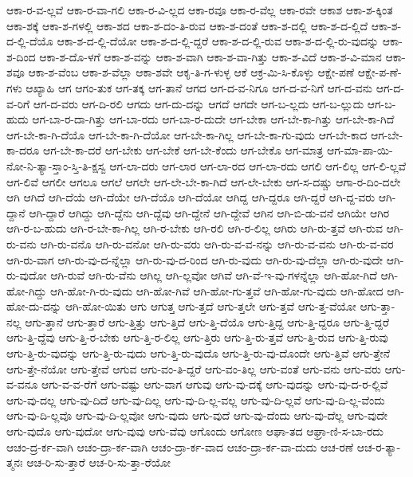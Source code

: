 {ಆಕಾ-ರ-ವ-ಲ್ಲವೆ
ಆಕಾ-ರ-ವಾ-ಗಲಿ
ಆಕಾ-ರ-ವಿ-ಲ್ಲದ
ಆಕಾ-ರವೂ
ಆಕಾ-ರ-ವೆಲ್ಲ
ಆಕಾ-ರವೇ
ಆಕಾಶ
ಆಕಾ-ಶ-ಕ್ಕಿಂತ
ಆಕಾ-ಶಕ್ಕೆ
ಆಕಾ-ಶ-ಗಳಲ್ಲಿ
ಆಕಾ-ಶದ
ಆಕಾ-ಶ-ದಂ-ತಿ-ರುವ
ಆಕಾ-ಶ-ದಂತೆ
ಆಕಾ-ಶ-ದಲ್ಲಿ
ಆಕಾ-ಶ-ದ-ಲ್ಲಿದೆ
ಆಕಾ-ಶ-ದ-ಲ್ಲಿ-ದೆಯೊ
ಆಕಾ-ಶ-ದ-ಲ್ಲಿ-ದೆಯೋ
ಆಕಾ-ಶ-ದ-ಲ್ಲಿ-ದ್ದರೆ
ಆಕಾ-ಶ-ದ-ಲ್ಲಿ-ರುವ
ಆಕಾ-ಶ-ದ-ಲ್ಲಿ-ರು-ವುದನ್ನು
ಆಕಾ-ಶ-ದಿಂದ
ಆಕಾ-ಶ-ದೊ-ಳಗೆ
ಆಕಾ-ಶ-ವನ್ನು
ಆಕಾ-ಶ-ವಾಗಿ
ಆಕಾ-ಶ-ವಾ-ಗಿತ್ತು
ಆಕಾ-ಶ-ವಿದೆ
ಆಕಾ-ಶ-ವಿ-ಮಾನ
ಆಕಾ-ಶವೂ
ಆಕಾ-ಶ-ವೆಂಬ
ಆಕಾ-ಶ-ವೆಲ್ಲಾ
ಆಕಾ-ಶವೇ
ಆಕೃ-ತಿ-ಗ-ಳುಳ್ಳ
ಆಕೆ
ಆಕ್ರ-ಮಿ-ಸಿ-ಕೊಳ್ಳು
ಆಕ್ಷೇ-ಪಣೆ
ಆಕ್ಷೇ-ಪ-ಣೆ-ಗಳು
ಆಖ್ಯಾಹಿ
ಆಗ
ಆಗಂ-ತುಕ
ಆಗ-ತಕ್ಕ
ಆಗ-ತಾನೆ
ಆಗದ
ಆಗ-ದ-ವ-ನಿಗೂ
ಆಗ-ದ-ವ-ನಿಗೆ
ಆಗ-ದ-ವನು
ಆಗ-ದ-ವ-ರಿಗೆ
ಆಗ-ದ-ವರು
ಆಗ-ದಿ-ರಲಿ
ಆಗದು
ಆಗ-ದು-ದನ್ನು
ಆಗದೆ
ಆಗದೇ
ಆಗ-ಬ-ಲ್ಲದು
ಆಗ-ಬ-ಲ್ಲುದು
ಆಗ-ಬ-ಹುದು
ಆಗ-ಬಾ-ರ-ದಾ-ಗಿತ್ತು
ಆಗ-ಬಾ-ರದು
ಆಗ-ಬಾ-ರ-ದುದೇ
ಆಗ-ಬೇಕಾ
ಆಗ-ಬೇ-ಕಾ-ಗಿತ್ತು
ಆಗ-ಬೇ-ಕಾ-ಗಿದೆ
ಆಗ-ಬೇ-ಕಾ-ಗಿ-ದೆಯೊ
ಆಗ-ಬೇ-ಕಾ-ಗಿ-ದೆಯೋ
ಆಗ-ಬೇ-ಕಾ-ಗಿಲ್ಲ
ಆಗ-ಬೇ-ಕಾ-ಗು-ವುದು
ಆಗ-ಬೇ-ಕಾದ
ಆಗ-ಬೇ-ಕಾ-ದರೂ
ಆಗ-ಬೇ-ಕಾ-ದರೆ
ಆಗ-ಬೇಕು
ಆಗ-ಬೇಕೆ
ಆಗ-ಬೇ-ಕೆಂದು
ಆಗ-ಬೇಕೊ
ಆಗ-ಮಾತ್ರ
ಆಗ-ಮಾ-ಪಾ-ಯಿ-ನೋ-ನಿ-ತ್ಯಾ-ಸ್ತಾಂ-ಸ್ತಿ-ತಿ-ಕ್ಷಸ್ವ
ಆಗ-ಲಾ-ದರು
ಆಗ-ಲಾರ
ಆಗ-ಲಾ-ರದ
ಆಗ-ಲಾ-ರದು
ಆಗಲಿ
ಆಗ-ಲಿಲ್ಲ
ಆಗ-ಲಿ-ಲ್ಲವೆ
ಆಗ-ಲಿವೆ
ಆಗಲೀ
ಆಗಲೂ
ಆಗಲೆ
ಆಗಲೇ
ಆಗ-ಲೇ-ಬೇ-ಕಾ-ಗಿದೆ
ಆಗ-ಲೇ-ಬೇಕು
ಆಗ-ಸ-ದಷ್ಚು
ಆಗಾ-ರ-ದಿಂ-ದಲೇ
ಆಗಿ
ಆಗಿದೆ
ಆಗಿ-ದೆಯೆ
ಆಗಿ-ದೆಯೇ
ಆಗಿ-ದೆಯೊ
ಆಗಿ-ದೆಯೋ
ಆಗಿದ್ದ
ಆಗಿ-ದ್ದರೂ
ಆಗಿ-ದ್ದರೆ
ಆಗಿ-ದ್ದ-ವರು
ಆಗಿ-ದ್ದಾನೆ
ಆಗಿ-ದ್ದಾರೆ
ಆಗಿದ್ದು
ಆಗಿ-ದ್ದೆನು
ಆಗಿ-ದ್ದೆವು
ಆಗಿ-ದ್ದೇನೆ
ಆಗಿ-ದ್ದೇವೆ
ಆಗಿನ
ಆಗಿ-ಬಿ-ಡು-ವನೆ
ಆಗಿಯೇ
ಆಗಿರ
ಆಗಿ-ರ-ಬ-ಹುದು
ಆಗಿ-ರ-ಬೇ-ಕಾ-ಗಿಲ್ಲ
ಆಗಿ-ರ-ಬೇಕು
ಆಗಿ-ರಲಿ
ಆಗಿ-ರ-ಲಿಲ್ಲ
ಆಗಿರು
ಆಗಿ-ರು-ತ್ತವೆ
ಆಗಿ-ರುವ
ಆಗಿ-ರು-ವನು
ಆಗಿ-ರು-ವನೊ
ಆಗಿ-ರು-ವನೋ
ಆಗಿ-ರು-ವರು
ಆಗಿ-ರು-ವ-ವ-ನನ್ನು
ಆಗಿ-ರು-ವ-ವನು
ಆಗಿ-ರು-ವ-ವರ
ಆಗಿ-ರು-ವಾಗ
ಆಗಿ-ರು-ವು-ದ-ನ್ನೆಲ್ಲಾ
ಆಗಿ-ರು-ವು-ದ-ರಿಂದ
ಆಗಿ-ರು-ವುದು
ಆಗಿ-ರು-ವು-ದೆಲ್ಲಾ
ಆಗಿ-ರು-ವುದೇ
ಆಗಿ-ರು-ವುದೋ
ಆಗಿ-ರುವೆ
ಆಗಿ-ರು-ವೆನು
ಆಗಿಲ್ಲ
ಆಗಿ-ಲ್ಲವೋ
ಆಗಿವೆ
ಆಗಿ-ವೆ-ಇ-ವು-ಗಳನ್ನೆಲ್ಲಾ
ಆಗಿ-ಹೋ-ಗಿದೆ
ಆಗಿ-ಹೋ-ಗಿದ್ದು
ಆಗಿ-ಹೋ-ಗಿ-ರು-ವುದು
ಆಗಿ-ಹೋ-ಗಿವೆ
ಆಗಿ-ಹೋ-ಗು-ತ್ತವೆ
ಆಗಿ-ಹೋ-ಗು-ವುದು
ಆಗಿ-ಹೋದ
ಆಗಿ-ಹೋ-ದು-ದನ್ನು
ಆಗಿ-ಹೋ-ಯಿತು
ಆಗು
ಆಗುತ್ತ
ಆಗು-ತ್ತದೆ
ಆಗು-ತ್ತಲೇ
ಆಗು-ತ್ತವೆ
ಆಗು-ತ್ತ-ವೆಯೋ
ಆಗು-ತ್ತಾ-ನಲ್ಲ
ಆಗು-ತ್ತಾನೆ
ಆಗು-ತ್ತಾರೆ
ಆಗು-ತ್ತಿತ್ತು
ಆಗು-ತ್ತಿದೆ
ಆಗು-ತ್ತಿ-ದೆಯೊ
ಆಗು-ತ್ತಿದ್ದ
ಆಗು-ತ್ತಿ-ದ್ದರೂ
ಆಗು-ತ್ತಿ-ದ್ದರೆ
ಆಗು-ತ್ತಿ-ದ್ದೆವು
ಆಗು-ತ್ತಿ-ರ-ಬೇಕು
ಆಗು-ತ್ತಿ-ರ-ಲಿಲ್ಲ
ಆಗು-ತ್ತಿರು
ಆಗು-ತ್ತಿ-ರು-ತ್ತವೆ
ಆಗು-ತ್ತಿ-ರುವ
ಆಗು-ತ್ತಿ-ರುವು
ಆಗು-ತ್ತಿ-ರು-ವುದನ್ನು
ಆಗು-ತ್ತಿ-ರು-ವುದು
ಆಗು-ತ್ತಿ-ರು-ವುದೊ
ಆಗು-ತ್ತಿ-ರು-ವು-ದೊಂದೇ
ಆಗು-ತ್ತಿವೆ
ಆಗು-ತ್ತೇನೆ
ಆಗು-ತ್ತೇ-ನೆಯೋ
ಆಗು-ತ್ತೇವೆ
ಆಗುವ
ಆಗು-ವಂ-ತಿ-ದ್ದರೆ
ಆಗು-ವಂ-ತಿಲ್ಲ
ಆಗು-ವಂತೆ
ಆಗು-ವನು
ಆಗು-ವರು
ಆಗು-ವ-ವನೂ
ಆಗು-ವ-ವ-ರೆಗೆ
ಆಗು-ವಷ್ಟು
ಆಗು-ವಾಗ
ಆಗುವು
ಆಗು-ವು-ದಕ್ಕೆ
ಆಗು-ವುದನ್ನು
ಆಗು-ವು-ದ-ರ-ಲ್ಲಿವೆ
ಆಗು-ವು-ದಲ್ಲ
ಆಗು-ವು-ದಿದೆ
ಆಗು-ವು-ದಿಲ್ಲ
ಆಗು-ವು-ದಿ-ಲ್ಲ-ವಲ್ಲ
ಆಗು-ವು-ದಿ-ಲ್ಲವೆ
ಆಗು-ವು-ದಿ-ಲ್ಲ-ವೆಂದು
ಆಗು-ವು-ದಿ-ಲ್ಲವೊ
ಆಗು-ವು-ದಿ-ಲ್ಲವೋ
ಆಗು-ವುದು
ಆಗು-ವುದೆ
ಆಗು-ವು-ದೆಂದು
ಆಗು-ವು-ದೆಲ್ಲ
ಆಗು-ವುದೇ
ಆಗು-ವುದೊ
ಆಗು-ವುದೋ
ಆಗು-ವುವು
ಆಗು-ವೆವು
ಆಗೊಂದು
ಆಗೋಣ
ಆಘಾ-ತದ
ಆಘ್ರಾ-ಣಿ-ಸ-ಬಾ-ರದು
ಆಚಂ-ದ್ರ-ರ್ಕ-ವಾಗಿ
ಆಚಂ-ದ್ರಾ-ರ್ಕ-ವಾಗಿ
ಆಚಂ-ದ್ರಾ-ರ್ಕ-ವಾದ
ಆಚಂ-ದ್ರಾ-ರ್ಕ-ವಾ-ದುದು
ಆಚ-ರಣೆ
ಆಚ-ರ-ತ್ಯಾ-ತ್ಮನಃ
ಆಚ-ರಿ-ಸು-ತ್ತಾರೆ
ಆಚ-ರಿ-ಸು-ತ್ತಾ-ರೆಯೋ
}
